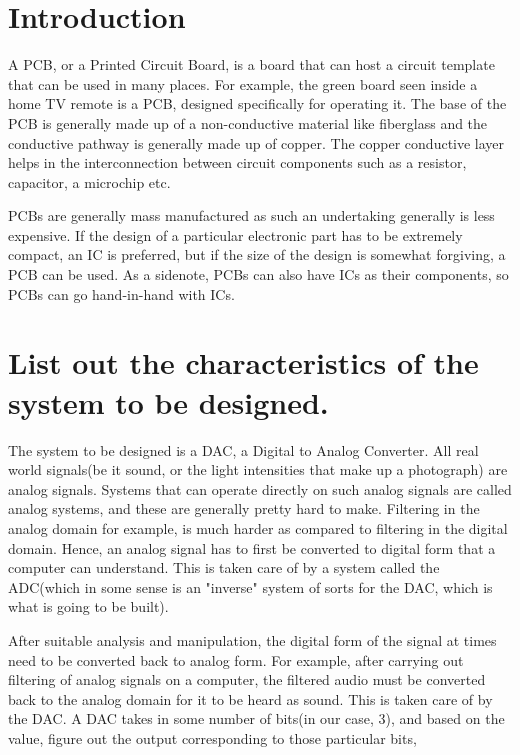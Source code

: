 \documentclass[oneside]{book}
\begin{document}

\newpage
\tableofcontents
\newpage
\Large

\chapter{Introduction} \label{Chapter-1}
A PCB, or a Printed Circuit Board, is a board that can host a circuit template that can be used in many places. For example, the green board seen inside a home TV remote is a PCB, designed specifically for operating it. The base of the PCB is generally made up of a non-conductive material like fiberglass and the conductive pathway is generally made up of copper. The copper conductive layer helps in the interconnection between circuit components such as a resistor, capacitor, a microchip etc. \\ \bigskip

PCBs are generally mass manufactured as such an undertaking generally is less expensive. If the design of a particular electronic part has to be extremely compact, an IC is preferred, but if the size of the design is somewhat forgiving, a PCB can be used. As a sidenote, PCBs can also have ICs as their components, so PCBs can go hand-in-hand with ICs.

\newpage
\chapter{List out the characteristics of the system to be designed.}
The system to be designed is a DAC, a Digital to Analog Converter. All real world signals(be it sound, or the light intensities that make up a photograph) are analog signals. Systems that can operate directly on such analog signals are called analog systems, and these are generally pretty hard to make. Filtering in the analog domain for example, is much harder as compared to filtering in the digital domain. Hence, an analog signal has to first be converted to digital form that a computer can understand. This is taken care of by a system called the ADC(which in some sense is an "inverse" system of sorts for the DAC, which is what is going to be built).\\ \bigskip

After suitable analysis and manipulation, the digital form of the signal at times need to be converted back to analog form. For example, after carrying out filtering of analog signals on a computer, the filtered audio must be converted back to the analog domain for it to be heard as sound. This is taken care of by the DAC. A DAC takes in some number of bits(in our case, 3), and based on the value, figure out the output corresponding to those particular bits,
\end{document}
